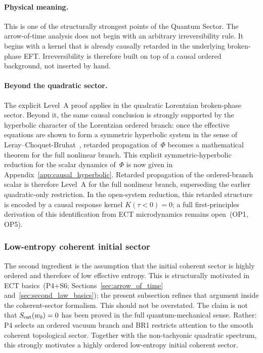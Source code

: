 \documentclass[11pt,a4paper]{article}
\numberwithin{equation}{section}
\begin{document}
\paragraph{Physical meaning.}
This is one of the structurally strongest points of the Quantum Sector.
The arrow-of-time analysis does not begin with an arbitrary
irreversibility rule.
It begins with a kernel that is already causally retarded in the
underlying broken-phase EFT.
Irreversibility is therefore built on top of a causal ordered
background, not inserted by hand.

\paragraph{Beyond the quadratic sector.}
The explicit Level~A proof applies in the quadratic Lorentzian
broken-phase sector.
Beyond it, the same causal conclusion is strongly supported by the
hyperbolic character of the Lorentzian ordered branch:
once the effective equations are shown to form a symmetric hyperbolic
system in the sense of Leray--Choquet-Bruhat~\cite{Leray1952,ChoquetBruhat1952},
retarded propagation of~$\Phi$ becomes a mathematical theorem for the
full nonlinear branch.
This explicit symmetric-hyperbolic reduction for the scalar dynamics
of~$\Phi$ is now given in Appendix~\ref{app:causal_hyperbolic}.
Retarded propagation of the ordered-branch scalar is therefore Level~A
for the full nonlinear branch, superseding the earlier quadratic-only
restriction.
In the open-system reduction, this retarded structure is encoded by a
causal response kernel $K(\tau<0)=0$; a full first-principles
derivation of this identification from ECT microdynamics remains
open~(OP1, OP5).

\subsubsection*{Low-entropy coherent initial sector}

The second ingredient is the assumption that the initial coherent
sector is highly ordered and therefore of low effective entropy.
This is structurally motivated in ECT basics~(P4+S6;
Sections~\ref{sec:arrow_of_time} and~\ref{sec:second_law_basics});
the present subsection refines that argument inside the
coherent-sector formalism.
This should not be overstated.
The claim is not that $S_{\rm ent}(w_0)=0$ has been proved in the
full quantum-mechanical sense.
Rather: P4 selects an ordered vacuum branch and BR1 restricts attention
to the smooth coherent topological sector.
Together with the non-tachyonic quadratic spectrum, this strongly
motivates a highly ordered low-entropy initial coherent sector.
\end{document}
